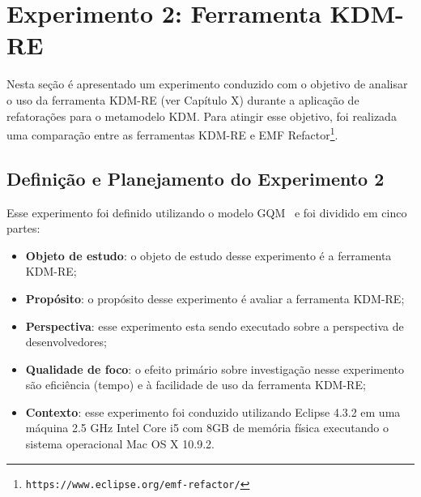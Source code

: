 



\section{Experimento 2: Ferramenta KDM-RE}\label{sec:experimento_KDM_re}

Nesta seção é apresentado um experimento conduzido com o objetivo de analisar o uso da ferramenta KDM-RE (ver Capítulo X) durante a aplicação de refatorações para o metamodelo KDM. Para atingir esse objetivo, foi realizada uma comparação entre as ferramentas KDM-RE e EMF Refactor\footnote{\texttt{https://www.eclipse.org/emf-refactor/}}.

\subsection{Definição e Planejamento do Experimento 2}

Esse experimento foi definido utilizando o modelo GQM~\cite{Wohlin} e foi dividido em cinco partes:

\begin{itemize}
\item \textbf{Objeto de estudo}: o objeto de estudo desse experimento é a ferramenta KDM-RE;
\item \textbf{Propósito}: o propósito desse experimento é avaliar a ferramenta KDM-RE;
\item \textbf{Perspectiva}: esse experimento esta sendo executado sobre a perspectiva de desenvolvedores;
\item \textbf{Qualidade de foco}: o efeito primário sobre investigação nesse experimento são eficiência (tempo) e à facilidade de uso da ferramenta KDM-RE;
\item \textbf{Contexto}: esse experimento foi conduzido utilizando Eclipse 4.3.2 em uma máquina 2.5 GHz Intel Core i5 com 8GB de memória física executando o sistema operacional Mac OS X 10.9.2.
\end{itemize}

